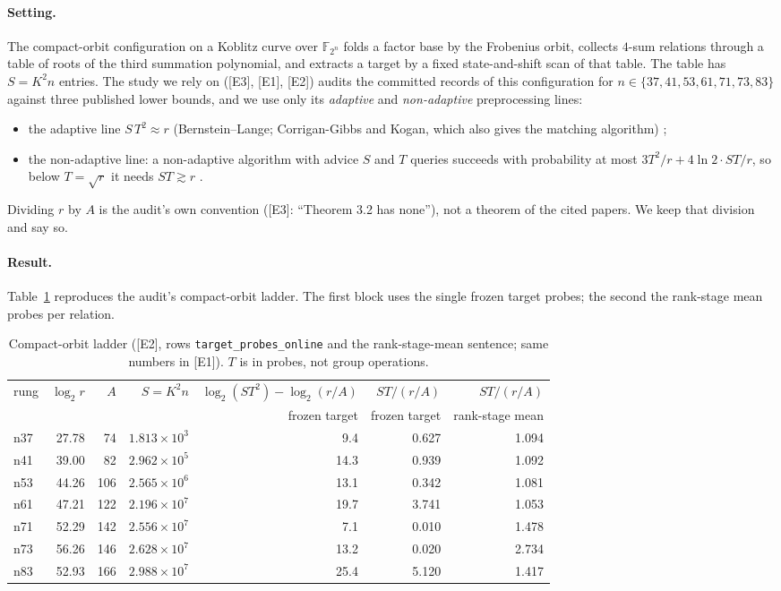 \documentclass[10pt,a4paper]{article}
\newcommand{\FF}{\mathbb{F}}
\newcommand{\ev}[1]{\textup{[#1]}}
\theoremstyle{definition}
\theoremstyle{remark}
\begin{document}
\paragraph{Setting.}
The compact-orbit configuration on a Koblitz curve over $\FF_{2^n}$ folds a
factor base by the Frobenius orbit, collects $4$-sum relations through a table of
roots of the third summation polynomial, and extracts a target by a fixed
state-and-shift scan of that table. The table has $S=K^2 n$ entries. The study
we rely on (\ev{E3}, \ev{E1}, \ev{E2}) audits the committed records of this
configuration for $n\in\{37,41,53,61,71,73,83\}$ against three published lower
bounds, and we use only its \emph{adaptive} and \emph{non-adaptive}
preprocessing lines:
\begin{itemize}
\item the adaptive line $S\,T^2 \approx r$ (Bernstein--Lange; Corrigan-Gibbs and
  Kogan, which also gives the matching algorithm) \cite{BL13,CGK18};
\item the non-adaptive line: a non-adaptive algorithm with advice $S$ and $T$
  queries succeeds with probability at most $3T^2/r + 4\ln 2\cdot ST/r$, so
  below $T=\sqrt r$ it needs $ST \gtrsim r$ \cite{DKM25}.
\end{itemize}
Dividing $r$ by $A$ is the audit's own convention (\ev{E3}: ``Theorem 3.2 has
none''), not a theorem of the cited papers. We keep that division and say so.

\paragraph{Result.}
Table~\ref{tab:s1} reproduces the audit's compact-orbit ladder. The first block
uses the single frozen target probes; the second the rank-stage mean probes per
relation.

\begin{table}[t]
\centering\small
\begin{tabular}{@{}lrrrrrr@{}}
\toprule
rung & $\log_2 r$ & $A$ & $S=K^2n$ & $\log_2(ST^2)-\log_2(r/A)$ & $ST/(r/A)$ & $ST/(r/A)$ \\
 & & & & frozen target & frozen target & rank-stage mean \\
\midrule
n37 & 27.78 & 74  & $1.813\times10^{3}$ & 9.4  & 0.627 & 1.094 \\
n41 & 39.00 & 82  & $2.962\times10^{5}$ & 14.3 & 0.939 & 1.092 \\
n53 & 44.26 & 106 & $2.565\times10^{6}$ & 13.1 & 0.342 & 1.081 \\
n61 & 47.21 & 122 & $2.196\times10^{7}$ & 19.7 & 3.741 & 1.053 \\
n71 & 52.29 & 142 & $2.556\times10^{7}$ & 7.1  & 0.010 & 1.478 \\
n73 & 56.26 & 146 & $2.628\times10^{7}$ & 13.2 & 0.020 & 2.734 \\
n83 & 52.93 & 166 & $2.988\times10^{7}$ & 25.4 & 5.120 & 1.417 \\
\bottomrule
\end{tabular}
\caption{Compact-orbit ladder (\ev{E2}, rows \texttt{target\_probes\_online} and
the rank-stage-mean sentence; same numbers in \ev{E1}). $T$ is in probes, not
group operations.}
\label{tab:s1}
\end{table}
\end{document}
